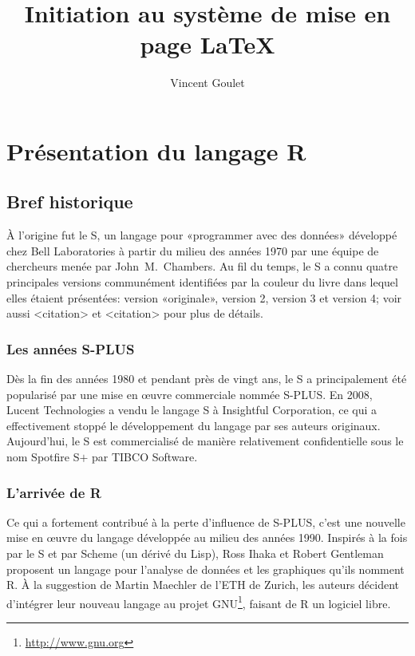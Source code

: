 \documentclass[11pt,french]{memoir}
\title{Initiation au système de mise en page \LaTeX}
\author{Vincent Goulet}
\begin{document}
\maketitle

\frontmatter

\tableofcontents

\mainmatter

\chapter{Présentation du langage R}
\label{chap:rpresentation}

\section{Bref historique}
\label{sec:rpresentation:historique}

À l'origine fut le S, un langage pour «programmer avec des données»
développé chez Bell Laboratories à partir du milieu des années 1970
par une équipe de chercheurs menée par John~M.\ Chambers. Au fil du
temps, le S a connu quatre principales versions communément
identifiées par la couleur du livre dans lequel elles étaient
présentées: %
version «originale», %
version 2, %
version 3 et %
version 4; %
voir aussi <citation> et <citation> pour plus de détails.

\subsection{Les années S-PLUS}

Dès la fin des années 1980 et pendant près de vingt ans, le S a
principalement été popularisé par une mise en {\oe}uvre commerciale
nommée S-PLUS. En 2008, Lucent Technologies a vendu le langage S à
Insightful Corporation, ce qui a effectivement stoppé le développement
du langage par ses auteurs originaux. Aujourd'hui, le S est
commercialisé de manière relativement confidentielle sous le nom
Spotfire S$+$ par TIBCO Software.

\subsection{L'arrivée de R}

Ce qui a fortement contribué à la perte d'influence de S-PLUS, c'est
une nouvelle mise en {\oe}uvre du langage développée au milieu des
années 1990. Inspirés à la fois par le S et par Scheme (un dérivé du
Lisp), Ross Ihaka et Robert Gentleman proposent un langage pour
l'analyse de données et les graphiques qu'ils nomment R. À la
suggestion de Martin Maechler de l'ETH de Zurich, les auteurs décident
d'intégrer leur nouveau langage au projet GNU\footnote{%
  \url{http://www.gnu.org}}, %
faisant de R un logiciel libre.
\end{document}
